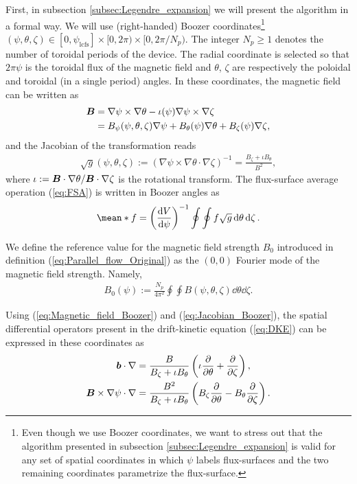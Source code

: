 \documentclass[10pt]{iopart}
\begin{document}
First, in subsection \ref{subsec:Legendre_expansion} we will present the algorithm in a formal way. We will use (right-handed) Boozer coordinates\footnote{Even though we use Boozer coordinates, we want to stress out that the algorithm presented in subsection \ref{subsec:Legendre_expansion} is valid for any set of spatial coordinates in which $\psi$ labels flux-surfaces and the two remaining coordinates parametrize the flux-surface.} $(\psi,\theta,\zeta)\in[0,\psi_{\text{lcfs}}]\times[0,2\pi)\times[0,2\pi/N_p)$. The integer $N_p\ge 1$ denotes the number of toroidal periods of the device. The radial coordinate is selected so that $2\pi \psi$ is the toroidal flux of the magnetic field and $\theta$, $\zeta$ are respectively the poloidal and toroidal (in a single period) angles. In these coordinates, the magnetic field can be written as
\begin{align}
	\vb*{B} & = \nabla\psi \times \nabla\theta - \iota(\psi) \nabla\psi \times \nabla\zeta 
	\nonumber\\
	& = B_\psi(\psi,\theta,\zeta) \nabla \psi + B_\theta(\psi) \nabla \theta + B_\zeta(\psi) \nabla \zeta,
	\label{eq:Magnetic_field_Boozer}
\end{align}
and the Jacobian of the transformation reads 
%
\begin{align}
	\sqrt{g}(\psi,\theta,\zeta) 
	:=( 
	\nabla\psi \times \nabla \theta \cdot \nabla\zeta  
	)^{-1} 
	= 
	\frac{B_\zeta + \iota B_\theta}{B^2},
	\label{eq:Jacobian_Boozer}
\end{align} 
where $\iota :=\vb*{B} \cdot \nabla \theta / \vb*{B} \cdot \nabla \zeta $ is the rotational transform. The flux-surface average operation (\ref{eq:FSA}) is written in Boozer angles as
%
\begin{align}
	\mean*{f}
	=
	\left(\dv{V}{\psi}\right)^{-1}
	\oint\oint
	f
	\sqrt{g}
	\dd{\theta}\dd{\zeta}
	.
	\label{eq:FSA_Boozer}
\end{align}

We define the reference value for the magnetic field strength $B_0$ introduced in definition (\ref{eq:Parallel_flow_Original}) as the $(0,0)$ Fourier mode of the magnetic field strength. Namely, 
%
\begin{align}
	B_0(\psi) := \frac{N_p}{4\pi^2 } 
	\oint\oint
	B(\psi,\theta,\zeta)
	\dd{\theta}\dd{\zeta}.
\end{align}

Using (\ref{eq:Magnetic_field_Boozer}) and (\ref{eq:Jacobian_Boozer}), the spatial differential operators present in the drift-kinetic equation (\ref{eq:DKE}) can be expressed in these coordinates as
%
\begin{align}
	\vb*{b} \cdot \nabla & = 
	\frac{B}{B_\zeta + \iota B_\theta}
	\left(
	\iota \pdv{\theta}
	+ 
	\pdv{\zeta} 
	\right), \label{eq:Parallel_streaming_spatial_operator}
	\\
	\vb*{B}\times\nabla\psi \cdot \nabla & = 
	\frac{B^2}{B_\zeta + \iota B_\theta}
	\left(
	B_\zeta \pdv{\theta}
	-
	B_\theta \pdv{\zeta}
	\right). \label{eq:ExB_spatial_operator}
\end{align}
\end{document}
